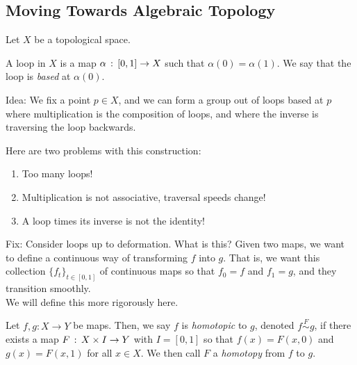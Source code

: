 \subsection*{Moving Towards Algebraic Topology}
\sectionspace

Let $X$ be a topological space. 

\begin{definition}
    A loop in $X$ is a map $\alpha \, :\, [0, 1] \to X$ such that $\alpha(0) = \alpha(1)$. We say that the loop is \emph{based} at $\alpha(0)$. 
\end{definition}

Idea: We fix a point $p \in X$, and we can form a group out of loops based at $p$ where multiplication is the composition of loops, and where the inverse is traversing the loop backwards.\\

Here are two problems with this construction:
\begin{enumerate}
    \item Too many loops!
    \item Multiplication is not associative, traversal speeds change!
    \item A loop times its inverse is not the identity!
\end{enumerate} 


Fix: Consider loops up to deformation. What is this? Given two maps, we want to define a continuous way of transforming $f$ into $g$. That is, we want this collection $\{f_{t}\}_{t \in [0, 1]}$ of continuous maps so that $f_{0} = f$ and $f_{1} = g$, and they transition smoothly. \\

We will define this more rigorously here. 

\begin{definition}
    Let $f, g : X \to Y$ be maps. Then, we say $f$ is \emph{homotopic} to $g$, denoted $f \overset{F}{\sim} g$,  if there exists a map $F \, :\, X \times I \to Y$ with $I = [0, 1]$ so that $f(x) = F(x, 0)$ and $g(x) = F(x, 1)$ for all $x \in X$. We then call $F$ a \emph{homotopy} from $f$ to $g$.  
\end{definition}
